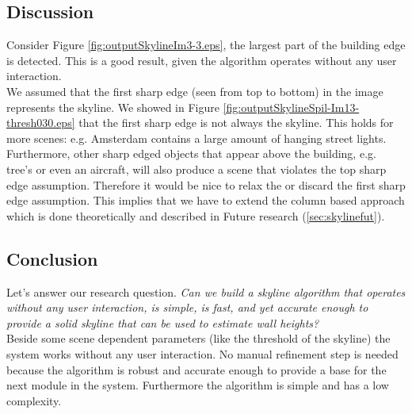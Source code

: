\newpage
{}


\clearpage

\subsection{Discussion}  %
Consider Figure \ref{fig:outputSkylineIm3-3.eps}, the largest part of the
building edge is detected. This is a good result, given the algorithm
operates without any user interaction.\\

We assumed that the first sharp edge (seen from top to bottom) in the image 
represents the skyline. We showed in Figure \ref{fig:outputSkylineSpil-Im13-thresh030.eps}
that the first sharp edge is not always the skyline.
This holds for more scenes: e.g. Amsterdam contains a large amount of
hanging street lights.  Furthermore, other sharp edged objects that appear above
the building, e.g. tree's or even an aircraft, will also produce a scene that
violates the top sharp edge assumption.  Therefore it would be nice to relax the or discard the first sharp edge assumption.
This implies that we have to extend the column based approach which is done
theoretically and described in Future research (\ref{sec:skylinefut}).

\subsection{Conclusion}
Let's answer our research question.
\emph{Can we build a skyline algorithm that operates without any user interaction, is
simple, is fast, and yet accurate enough to provide a solid skyline that can be
used to estimate wall heights?}\\

Beside some scene dependent parameters (like the threshold of the skyline) the
system works without any user interaction. No manual refinement step is needed
because the algorithm is robust and accurate enough to provide a base for the
next module in the system. Furthermore the algorithm is simple and has a low
complexity.\\

